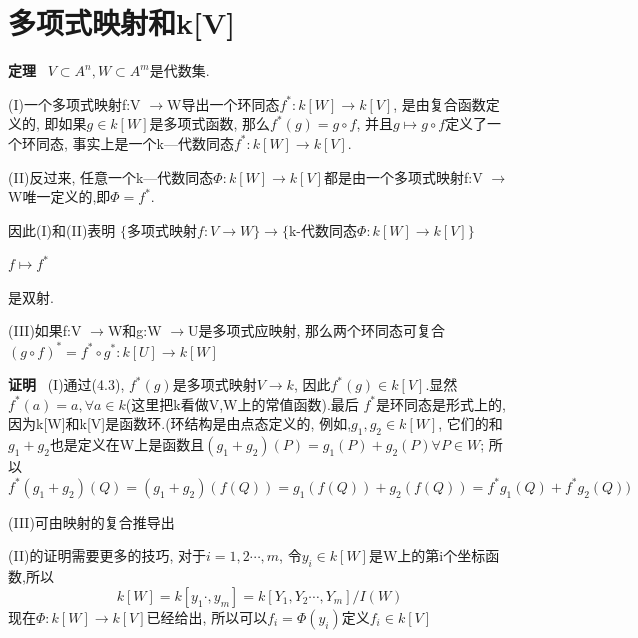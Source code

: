 \documentclass[UTF8]{book}
\begin{document}
	\section{多项式映射和k[V]}
		\textbf{定理} \ $V\subset A^{n},W\subset A^{m}$是代数集.

		(I)一个多项式映射f:V $\rightarrow $W导出一个环同态$f^{*}:k[W]\rightarrow k[V]$, 是由复合函数定义的, 即如果$g\in k[W]$是多项式函数, 那么$f^{*}(g)=g\circ f$, 并且$g\mapsto g\circ f$定义了一个环同态, 事实上是一个k—代数同态$f^{*}:k[W]\rightarrow k[V]$.

		(II)反过来, 任意一个k—代数同态$\Phi:k[W]\rightarrow k[V]$都是由一个多项式映射f:V $\rightarrow $W唯一定义的,即$\Phi=f^{*}$.

		因此(I)和(II)表明
		\center  $\{$多项式映射$f:V \rightarrow W \}\longrightarrow $$\{$k-代数同态$\Phi:k[W]\rightarrow k[V]\}$



			  $ f \longmapsto f^{*}$

		\justifying


		是双射.

		(III)如果f:V $\rightarrow $W和g:W $\rightarrow $U是多项式应映射, 那么两个环同态可复合$(g\circ f)^{*}=f^{*}\circ g^{*}:k[U]\rightarrow k[W]$

		\textbf{证明} \ (I)通过(4.3), $f^{*}(g)$是多项式映射$V\rightarrow k$, 因此$f^{*}(g)\in k[V]$.显然 $f^{*}(a)=a, \forall a\in k$(这里把k看做V,W上的常值函数).最后 $f^{*}$是环同态是形式上的, 因为k[W]和k[V]是函数环.(环结构是由点态定义的, 例如,$g_{1},g_{2}\in k[W]$, 它们的和 $g_{1}+g_{2}$也是定义在W上是函数且$(g_{1}+g_{2})(P)=g_{1}(P)+g_{2}(P) \forall P\in W$; 所以$f^{*}(g_{1}+g_{2})(Q)=(g_{1}+g_{2})(f(Q))= g_{1}(f(Q))+g_{2}(f(Q))= f^{*}g_{1}(Q)+f^{*}g_{2}(Q))$

		(III)可由映射的复合推导出

		(II)的证明需要更多的技巧, 对于$i=1,2\cdots,m$, 令$y_{i}\in k[W]$是W上的第i个坐标函数,所以
		\begin{equation*}
		k[W]=k[y_{1}  \cdot, y_{m}]=k[Y_{1},Y_{2} \cdots,Y_{m}]/I(W)
		\end{equation*}
		现在$\Phi:k[W]\rightarrow k[V]$已经给出, 所以可以$f_{i}=\Phi(y_{i})$定义$f_{i}\in k[V]$
\end{document}
